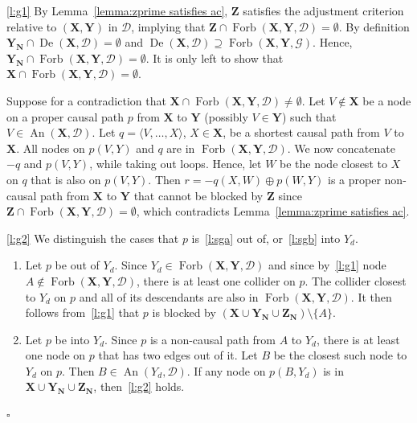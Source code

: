 \documentclass[11pt,a4paper]{article}
\newenvironment{proofof}[1][]{\begin{trivlist}
   \item[\hskip \labelsep {\bfseries Proof of #1.}]}{\hfill{}$\square$\end{trivlist}}
\DeclareMathOperator{\De}{De}
\DeclareMathOperator{\An}{An}
\DeclareMathOperator{\Forbi}{Forb}
\newcommand{\g}[1][G]{\mathcal{#1}}
\newcommand{\fb}[2][X,Y]{\Forbi(\mathbf{#1},#2)}%
\begin{document}
\begin{proofof}[Lemma~\ref{lemma:shpitser ynyd}]

\ref{l:g1} By Lemma~\ref{lemma:zprime satisfies ac}, $\mathbf{Z}$ satisfies the adjustment criterion relative to $(\mathbf{X,Y})$ in $\g[D]$, implying that $\mathbf{Z} \cap \fb{\g[D]} = \emptyset$. By definition $\mathbf{Y_N} \cap \De(\mathbf{X},\g[D]) = \emptyset$ and $\De(\mathbf{X},\g[D]) \supseteq \fb{\g}$. Hence, $\mathbf{Y_N} \cap \fb{\g[D]} = \emptyset$. It is only left to show that $\mathbf{X} \cap \fb{\g[D]} = \emptyset$.

Suppose for a contradiction that $\mathbf{X} \cap \fb{\g[D]} \neq \emptyset$. Let $V \notin \mathbf{X}$ be a node on a proper causal path $p$ from $\mathbf{X}$ to $\mathbf{Y}$ (possibly $V \in \mathbf{Y}$) such that $V \in \An(\mathbf{X},\g[D])$. Let $q = \langle V,\dots,X \rangle$, $X \in \mathbf{X}$, be a shortest causal path from $V$ to $\mathbf{X}$. All nodes on $p(V,Y)$ and $q$ are in $\fb{\g[D]}$. We now concatenate $-q$ and $p(V,Y)$, while taking out loops. Hence, let $W$ be the node closest to $X$ on $q$ that is also on $p(V,Y)$. Then $r = -q(X,W) \oplus p(W,Y)$ is a proper non-causal path from $\mathbf{X}$ to $\mathbf{Y}$ that cannot be blocked by $\mathbf{Z}$ since $\mathbf{Z} \cap \fb{\g[D]} = \emptyset$, which contradicts Lemma~\ref{lemma:zprime satisfies ac}.

\ref{l:g2} We distinguish the cases that $p$ is~\ref{l:sga} out of, or~\ref{l:sgb} into $Y_d$.
\begin{enumerate}[label = (\alph*)]
\item\label{l:sga} Let $p$ be out of $Y_d$. Since $Y_d \in \fb{\g[D]}$ and since by~\ref{l:g1} node $A \notin \fb{\g[D]}$, there is at least one collider on $p$. The collider closest to $Y_d$ on $p$ and all of its descendants are also in $\fb{\g[D]}$. It then follows from~\ref{l:g1} that $p$ is blocked by $(\mathbf{X} \cup \mathbf{Y_N} \cup \mathbf{Z_N}) \setminus \{A\}$.
\item\label{l:sgb} Let $p$ be into $Y_d$. Since $p$ is a non-causal path from $A$ to $Y_d$, there is at least one node on $p$ that has two edges out of it. Let $B$ be the closest such node to $Y_d$ on $p$. Then $B \in \An(Y_d,\g[D])$. If any node on $p(B,Y_d)$ is in $\mathbf{X} \cup \mathbf{Y_N} \cup \mathbf{Z_N}$, then~\ref{l:g2} holds.


\end{enumerate}
\end{proofof}
\end{document}
